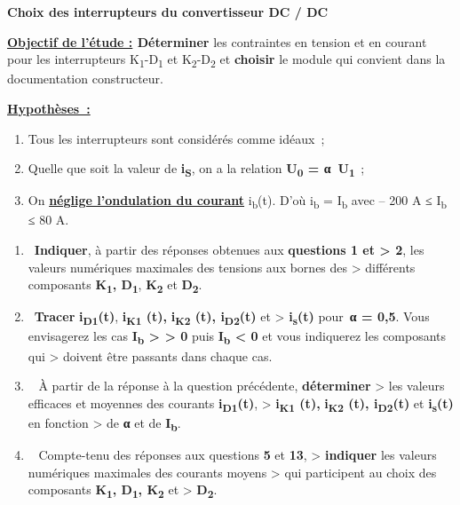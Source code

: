 \textbf{Choix des interrupteurs du convertisseur DC / DC}

\textbf{\ul{Objectif de l'étude :} Déterminer} les contraintes en tension et en courant pour les interrupteurs K\textsubscript{1}-D\textsubscript{1} et K\textsubscript{2}-D\textsubscript{2} et \textbf{choisir} le module qui convient dans la documentation constructeur.

\textbf{\ul{Hypothèses~:}}

\begin{enumerate}
\def\labelenumi{\alph{enumi}.}
\item
  Tous les interrupteurs sont considérés comme idéaux~;
\item
  Quelle que soit la valeur de \textbf{i\textsubscript{S}}, on a la relation \textbf{U\textsubscript{0} = α~U\textsubscript{1~}};
\item
  On \textbf{\ul{néglige l'ondulation du courant}} i\textsubscript{b}(t). D'où i\textsubscript{b} = I\textsubscript{b} avec -- 200 A ≤ I\textsubscript{b} ≤ 80 A.
\end{enumerate}

\begin{enumerate}
\def\labelenumi{\arabic{enumi}.}
\setcounter{enumi}{10}
\item
  ~\textbf{Indiquer}, à partir des réponses obtenues aux \textbf{questions 1 et \textgreater{} 2}, les valeurs numériques maximales des tensions aux bornes des \textgreater{} différents composants \textbf{K\textsubscript{1}, D\textsubscript{1}}, \textbf{K\textsubscript{2}} et \textbf{D\textsubscript{2}}.
\item
  ~\textbf{Tracer} \textbf{i\textsubscript{D1}(t)}, \textbf{i\textsubscript{K1} (t),} \textbf{i\textsubscript{K2} (t), i\textsubscript{D2}(t)} et \textgreater{} \textbf{i\textsubscript{s}(t)} pour~\textbf{α = 0,5}. Vous envisagerez les cas \textbf{I\textsubscript{b} \textgreater{} \textgreater{} 0} puis \textbf{I\textsubscript{b} \textless{} 0} et vous indiquerez les composants qui \textgreater{} doivent être passants dans chaque cas.
\item
  ~ À partir de la réponse à la question précédente, \textbf{déterminer} \textgreater{} les valeurs efficaces et moyennes des courants \textbf{i\textsubscript{D1}(t)}, \textgreater{} \textbf{i\textsubscript{K1} (t),} \textbf{i\textsubscript{K2} (t), i\textsubscript{D2}(t)} et \textbf{i\textsubscript{s}(t)} en fonction \textgreater{} de \textbf{α} et de \textbf{I\textsubscript{b}}.
\item
  ~ Compte-tenu des réponses aux questions \textbf{5} et \textbf{13}, \textgreater{} \textbf{indiquer} les valeurs numériques maximales des courants moyens \textgreater{} qui participent au choix des composants \textbf{K\textsubscript{1}, D\textsubscript{1}, K\textsubscript{2}} et \textgreater{} \textbf{D\textsubscript{2}}.
\end{enumerate}


